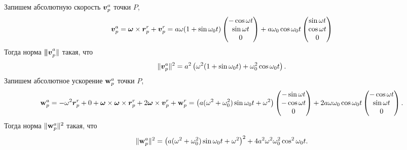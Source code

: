 Запишем абсолютную скорость $\mbox{\boldmath $v$}_p^a$ точки $P$,
$$
    \mbox{\boldmath $v$}_p^a = \mbox{\boldmath $\omega$} \times \mbox{\boldmath $r$}_p^r + \mbox{\boldmath $v$}_p^r =
    a \omega (1 + \sin \omega_0 t) \begin{pmatrix}
        -\cos \omega t \\
        \sin \omega t \\
        0 
    \end{pmatrix}
    + a \omega_0 \cos \omega_0 t \begin{pmatrix}
        \sin \omega t \\
        \cos \omega t \\
        0
    \end{pmatrix}
$$
Тогда норма $\mbox{\boldmath $\|v$}_p^a\|$ такая, что
$$
    \|\mbox{\boldmath $v$}_p^a\|^2 = a^2 \left(
        \omega^2 (1+\sin \omega_0 t) +
        \omega_0^2 \cos \omega_0 t
    \right).
$$
Запишем абсолютное ускорение $\mbox{\boldmath $\mathrm{w}$}_p^a$ точки $P$,
$$
    \mbox{\boldmath $\mathrm{w}$}_p^a = - \omega^2 \mbox{\boldmath $r$}_p^r + 0 + \mbox{\boldmath $\omega$} \times  \mbox{\boldmath $\omega$} \times \mbox{\boldmath $r$}_p^r + 2 \mbox{\boldmath $\omega$} \times \mbox{\boldmath $v$}_p^r + \mbox{\boldmath $\mathrm{w}$}_p^r
    =
    \left(a (\omega^2 + \omega_0^2) \sin \omega_0 t + \omega^2\right) \begin{pmatrix}
        - \sin \omega t \\
        - \cos \omega t \\
        0
    \end{pmatrix}
    +
    2 a \omega \omega_0 \cos \omega_0 t
    \begin{pmatrix}
        - \cos \omega t \\
        \sin \omega t \\
        0
    \end{pmatrix}.
$$
Тогда норма $ \|\mbox{\boldmath $\mathrm{w}$}_p^a\|^2 $ такая, что
$$
    \|\mbox{\boldmath $\mathrm{w}$}_p^a\|^2 = \left(
        a (\omega^2 + \omega_0^2) \sin \omega_0 t + \omega^2
    \right)^2 +
    4 a^2 \omega^2 \omega_0^2 \cos^2 \omega_0 t.
$$
